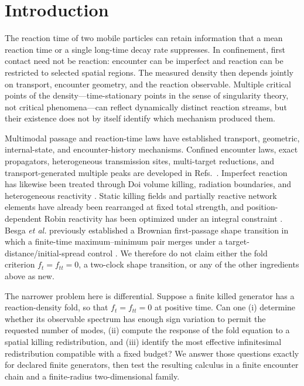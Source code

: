 \documentclass[aps,pre,reprint,amsmath,amssymb,longbibliography,floatfix]{revtex4-2}
\begin{document}
\section{Introduction}
\label{sec:introduction}

The reaction time of two mobile particles can retain information that a mean
reaction time or a single long-time decay rate suppresses. In confinement,
first contact need not be reaction: encounter can be imperfect and
reaction can be restricted to selected spatial regions. The measured density
then depends jointly on transport, encounter geometry, and the reaction
observable. Multiple critical points of the density---time-stationary points in the
sense of singularity theory, not critical phenomena---can reflect
dynamically distinct
reaction streams, but their existence does not by itself identify which
mechanism produced them.

Multimodal passage and reaction-time laws have established transport,
geometric, internal-state, and encounter-history mechanisms. Confined
encounter laws, exact propagators, heterogeneous transmission sites,
multi-target reductions, and transport-generated multiple peaks are developed
in Refs.~\cite{levot2020firstencounter,levot2022firstencounter,
giuggioli2013encounter,giuggioli2020exact,
giuggioliSarvaharman2022transmission,sarvaharmanGiuggioli2023particle,
sarvaharmanGiuggioli2020biased,marrisGiuggioli2024persistent,
giuggioliEtAl2024multitarget}. Imperfect reaction has likewise been treated
through Doi volume killing, radiation boundaries, and heterogeneous
reactivity \cite{doi1976stochastic,isaacson2009rdme,
isaacsonMauroNewby2016uniform,chapmanErbanIsaacson2016reactive,
grebenkov2019spectral,grebenkov2020sphericaltraps}. Static killing fields and
partially reactive network elements have already been rearranged at fixed
total strength, and position-dependent Robin reactivity has been optimized
under an integral constraint
\cite{nguyenGrebenkov2010porous,scottEtAl2021tubular,
nicolaouMulder2023flux}. Besga \emph{et al.} previously established a Brownian
first-passage shape transition in which a finite-time maximum--minimum pair
merges under a target-distance/initial-spread control
\cite{besgaEtAl2021dynamical}. We therefore do not claim either the fold
criterion \(f_t=f_{tt}=0\), a two-clock shape transition, or any of the other
ingredients above as new.

The narrower problem here is differential. Suppose a finite killed generator
has a reaction-density fold, so that
\(f_t=f_{tt}=0\) at positive time. Can one (i) determine whether its observable
spectrum has enough sign variation to permit the requested number of modes,
(ii) compute the response of the fold equation to a spatial killing
redistribution, and (iii) identify the most effective infinitesimal
redistribution compatible with a fixed budget? We answer those questions
exactly for declared finite generators, then test the resulting calculus in a
finite encounter chain and a finite-radius two-dimensional family.
\end{document}

